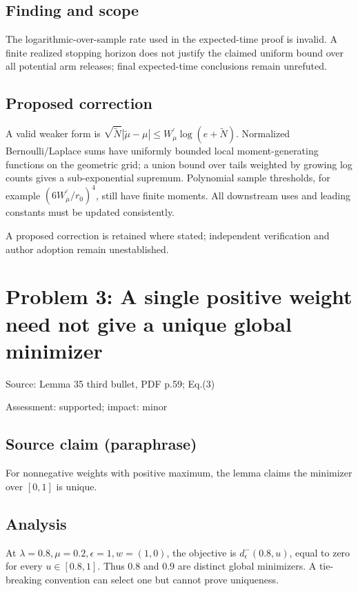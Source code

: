 \documentclass[11pt]{article}
\begin{document}
\subsection*{Finding and scope}

The logarithmic-over-sample rate used in the expected-time proof is invalid. A finite realized stopping horizon does not justify the claimed uniform bound over all potential arm releases; final expected-time conclusions remain unrefuted.

\subsection*{Proposed correction}

A valid weaker form is \(\sqrt{\widetilde N}|\widetilde\mu-\mu|\le W^\prime_\mu\log(e+\widetilde N)\). Normalized Bernoulli/Laplace sums have uniformly bounded local moment-generating functions on the geometric grid; a union bound over tails weighted by growing log counts gives a sub-exponential supremum. Polynomial sample thresholds, for example \((6W^\prime_\mu/r_0)^4\), still have finite moments. All downstream uses and leading constants must be updated consistently.

A proposed correction is retained where stated; independent verification and author adoption remain unestablished.

\section*{Problem 3: A single positive weight need not give a unique global minimizer}

Source: Lemma 35 third bullet, PDF p.59; Eq.(3)

Assessment: supported; impact: minor

\subsection*{Source claim (paraphrase)}

For nonnegative weights with positive maximum, the lemma claims the minimizer over \([0,1]\) is unique.

\subsection*{Analysis}

At \(\lambda=0.8,\mu=0.2,\epsilon=1,w=(1,0)\), the objective is \(d_\epsilon^-(0.8,u)\), equal to zero for every \(u\in[0.8,1]\). Thus \(0.8\) and \(0.9\) are distinct global minimizers. A tie-breaking convention can select one but cannot prove uniqueness.
\end{document}
